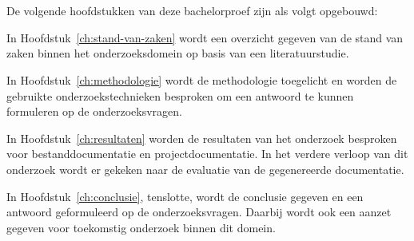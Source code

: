 \section{}%
\label{sec:opzet-bachelorproef}


De volgende hoofdstukken van deze bachelorproef zijn als volgt opgebouwd:

In Hoofdstuk~\ref{ch:stand-van-zaken} wordt een overzicht gegeven van de stand van zaken binnen het onderzoeksdomein op basis van een literatuurstudie.

In Hoofdstuk~\ref{ch:methodologie} wordt de methodologie toegelicht en worden de gebruikte onderzoekstechnieken besproken om een antwoord te kunnen formuleren op de onderzoeksvragen.


In Hoofdstuk~\ref{ch:resultaten} worden de resultaten van het onderzoek besproken voor bestanddocumentatie en projectdocumentatie.
In het verdere verloop van dit onderzoek wordt er gekeken naar de evaluatie van de gegenereerde documentatie.

In Hoofdstuk~\ref{ch:conclusie}, tenslotte, wordt de conclusie gegeven en een antwoord geformuleerd op de onderzoeksvragen. Daarbij wordt ook een aanzet gegeven voor toekomstig onderzoek binnen dit domein.